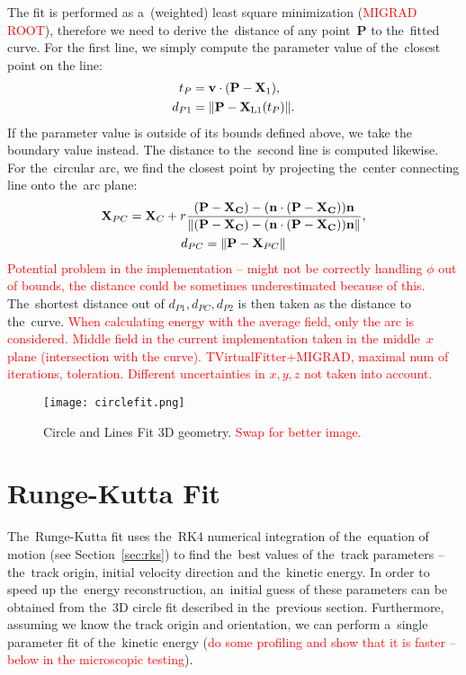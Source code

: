 			The fit is performed as a~(weighted) least square minimization (\textcolor{red}{MIGRAD ROOT}), therefore we need to derive the~distance of any point~$\mathbf{P}$ to the~fitted curve. For the first line, we simply compute the parameter value of the~closest point on the line:
				\begin{equation}
					\label{eq:segdist}
					\begin{aligned}
						t_P &= \mathbf{v}\cdot(\mathbf{P}-\mathbf{X}_1),\\
						d_{P1} &= \norm{\mathbf{P}-\mathbf{X}_\text{L1}(t_P)}.
					\end{aligned}
				\end{equation}
			If the parameter value is outside of its bounds defined above, we take the boundary value instead. The distance to the~second line is computed likewise. For the~circular arc, we find the closest point by projecting the~center connecting line onto the~arc plane:
				\begin{gather}
					\mathbf{X}_{PC} = \mathbf{X}_C + r\frac{(\mathbf{P-\mathbf{X}_C})-(\mathbf{n}\cdot(\mathbf{P-\mathbf{X}_C}))\mathbf{n}}{\norm{(\mathbf{P-\mathbf{X}_C})-(\mathbf{n}\cdot(\mathbf{P-\mathbf{X}_C}))\mathbf{n}}},\\
					d_{PC} = \norm{\mathbf{P}-\mathbf{X}_{PC}}
				\end{gather}
			\textcolor{red}{Potential problem in the implementation -- might not be correctly handling $\phi$ out of bounds, the distance could be sometimes underestimated because of this.} The~shortest distance out of $d_{P1},d_{PC},d_{P2}$ is then taken as the distance to the~curve. \textcolor{red}{When calculating energy with the average field, only the arc is considered. Middle field in the current implementation taken in the middle~$x$ plane (intersection with the curve). TVirtualFitter+MIGRAD, maximal num of iterations, toleration. Different uncertainties in $x,y,z$ not taken into account.}
			
			\begin{figure}
				\centering
				\texttt{[image: circlefit.png]}
				\caption{Circle and Lines Fit 3D geometry. \textcolor{red}{Swap for better image.}}
				\label{fig:circlefit}
			\end{figure}
	
	\section{Runge-Kutta Fit}
		The~Runge-Kutta fit uses the~\acf{RK4} numerical integration of the~equation of motion (see Section~\ref{sec:rks}) to find the~best values of the~track parameters -- the~track origin, initial velocity direction and the~kinetic energy. In order to speed up the~energy reconstruction, an~initial guess of these parameters can be obtained from the~3D circle fit described in the~previous section. Furthermore, assuming we know the track origin and orientation, we can perform a~single parameter fit of the~kinetic energy (\textcolor{red}{do some profiling and show that it is faster -- below in the microscopic testing}).
		
